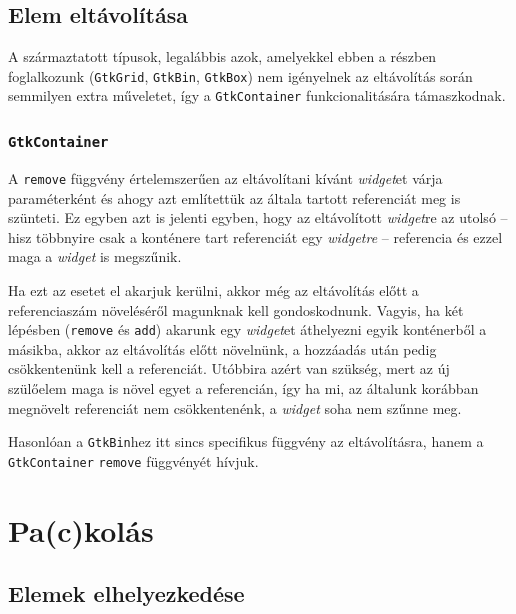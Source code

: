 \subsection{Elem eltávolítása}

A származtatott típusok, legalábbis azok, amelyekkel ebben a részben foglalkozunk (\texttt{GtkGrid}, \texttt{GtkBin}, \texttt{GtkBox}) nem igényelnek az eltávolítás során semmilyen extra műveletet, így a \texttt{GtkContainer} funkcionalitására támaszkodnak.

\subsubsection{\texttt{GtkContainer}}

A \texttt{remove} függvény értelemszerűen az eltávolítani kívánt \textit{widget}et várja paraméterként és ahogy azt említettük az általa tartott referenciát meg is szünteti. Ez egyben azt is jelenti egyben, hogy az eltávolított \textit{widget}re az utolsó -- hisz többnyire csak a konténere tart referenciát egy \textit{widgetre} -- referencia és ezzel maga a \textit{widget} is megszűnik.

Ha ezt az esetet el akarjuk kerülni, akkor még az eltávolítás előtt a referenciaszám növeléséről magunknak kell gondoskodnunk. Vagyis, ha két lépésben (\texttt{remove} és \texttt{add}) akarunk egy \textit{widget}et áthelyezni egyik konténerből a másikba, akkor az eltávolítás előtt növelnünk, a hozzáadás után pedig csökkentenünk kell a referenciát. Utóbbira azért van szükség, mert az új szülőelem maga is növel egyet a referencián, így ha mi, az általunk korábban megnövelt referenciát nem csökkentenénk, a \textit{widget} soha nem szűnne meg.

Hasonlóan a \texttt{GtkBin}hez itt sincs specifikus függvény az eltávolításra, hanem a \texttt{GtkContainer} \texttt{remove} függvényét hívjuk.

\section{Pa(c)kolás}
\label{sec:packing}

\subsection{Elemek elhelyezkedése}

